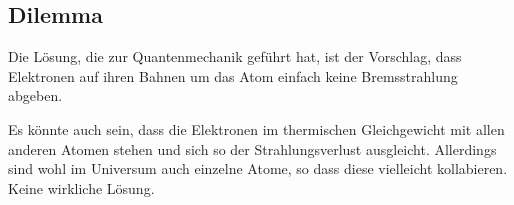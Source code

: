 \subsection{Dilemma}

Die Lösung, die zur Quantenmechanik geführt hat, ist der Vorschlag, dass
Elektronen auf ihren Bahnen um das Atom einfach keine Bremsstrahlung abgeben.

Es könnte auch sein, dass die Elektronen im thermischen Gleichgewicht mit allen
anderen Atomen stehen und sich so der Strahlungsverlust ausgleicht. Allerdings
sind wohl im Universum auch einzelne Atome, so dass diese vielleicht
kollabieren. Keine wirkliche Lösung.



\IfFileExists{\bibliographyfile}{
}{}



